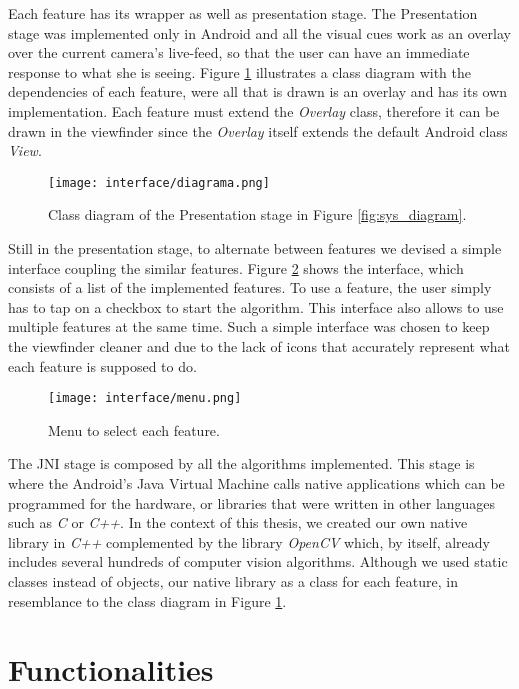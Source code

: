 Each feature has its wrapper as well as presentation stage. The Presentation stage was implemented only in Android and all the visual cues work as an overlay over the current camera's live-feed, so that the user can have an immediate response to what she is seeing. Figure \ref{fig:class_diagram} illustrates a class diagram with the dependencies of each feature, were all that is drawn is an overlay and has its own implementation. Each feature must extend the \emph{Overlay} class, therefore it can be drawn in the viewfinder since the \emph{Overlay} itself extends the default Android class \emph{View}.

\begin{figure}[htb]
	\centering
	\texttt{[image: interface/diagrama.png]}
	\caption{Class diagram of the Presentation stage in Figure \ref{fig:sys_diagram}.}
	\label{fig:class_diagram}
\end{figure}

Still in the presentation stage, to alternate between features we devised a simple interface coupling the similar features. Figure \ref{fig:app_menu} shows the interface, which consists of a list of the implemented features. To use a feature, the user simply has to tap on a checkbox to start the algorithm. This interface also allows to use multiple features at the same time. Such a simple interface was chosen to keep the viewfinder cleaner and due to the lack of icons that accurately represent what each feature is supposed to do.
\begin{figure}[htb]
	\centering
	\texttt{[image: interface/menu.png]}
	\caption{Menu to select each feature.}
	\label{fig:app_menu}
\end{figure}


The JNI stage is composed by all the algorithms implemented. This stage is where the Android's Java Virtual Machine calls native applications which can be programmed for the hardware, or libraries that were written in other languages such as \emph{C} or \emph{C++}. In the context of this thesis, we created our own native library in \emph{C++} complemented by the library \emph{OpenCV} which, by itself, already includes several hundreds of computer vision algorithms. Although we used static classes instead of objects, our native library as a class for each feature, in resemblance to the class diagram in Figure \ref{fig:class_diagram}.

\section{Functionalities}
\label{sec:functionalities}

